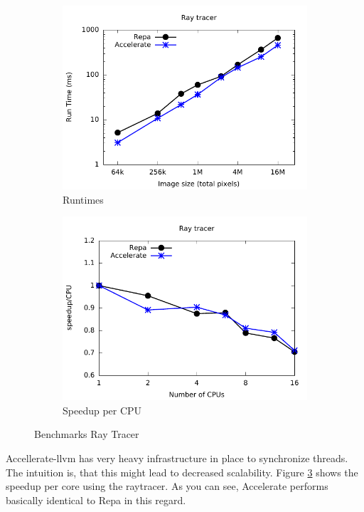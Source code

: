 \documentclass[a4paper,bibliography=totocnumbered,parskip,headsepline]{scrbook}
\begin{document}
\begin{figure}
\centering
\begin{subfigure}[t]{0.8\linewidth}
    \centering
    \includegraphics[width=\textwidth]{images/benchmarks/ray/ray}
    \caption{Runtimes}
    \label{fig:ray_bench}
\end{subfigure}
\begin{subfigure}[t]{0.8\linewidth}
    \centering
    \includegraphics[width=\textwidth]{images/benchmarks/ray/ray-scale}
    \caption{Speedup per CPU}
    \label{fig:ray_scale}
\end{subfigure}
\caption{Benchmarks Ray Tracer}
\end{figure}

\newpage
Accellerate-llvm has very heavy infrastructure in place to synchronize threads.
The intuition is, that this might lead to decreased scalability.
Figure \ref{fig:ray_scale} shows the speedup per core using the raytracer.
As you can see, Accelerate performs basically identical to Repa in this regard.
\end{document}
